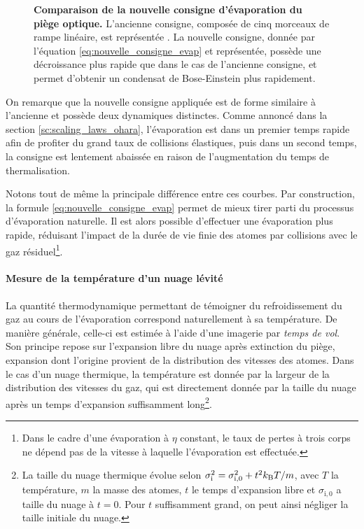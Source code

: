 \begin{figure}
\centering

\caption{\textbf{Comparaison de la nouvelle consigne d'évaporation du piège optique.} L'ancienne consigne, composée de cinq morceaux de rampe linéaire, est représentée . La nouvelle consigne, donnée par l'équation \ref{eq:nouvelle_consigne_evap} et représentée, possède une décroissance plus rapide que dans le cas de l'ancienne consigne, et permet d'obtenir un condensat de Bose-Einstein plus rapidement.}
\label{fig:comparaison_consigne_evap}
\end{figure}

On remarque que la nouvelle consigne appliquée est de forme similaire à l'ancienne et possède deux dynamiques distinctes. Comme annoncé dans la section \ref{sc:scaling_laws_ohara}, l'évaporation est dans un premier temps rapide afin de profiter du grand taux de collisions élastiques, puis dans un second temps, la consigne est lentement abaissée en raison de l'augmentation du temps de thermalisation. 

Notons tout de même la principale différence entre ces courbes. Par construction, la formule \ref{eq:nouvelle_consigne_evap} permet de mieux tirer parti du processus d'évaporation naturelle. Il est alors possible d'effectuer une évaporation plus rapide, réduisant l'impact de la durée de vie finie des atomes par collisions avec le gaz résiduel\footnote{Dans le cadre d'une évaporation à $\eta$ constant, le taux de pertes à trois corps ne dépend pas de la vitesse à laquelle l'évaporation est effectuée.}.
 









\paragraph*{Mesure de la température d'un nuage lévité}
La quantité thermodynamique permettant de témoigner du refroidissement du gaz au cours de l'évaporation correspond naturellement à sa température. De manière générale, celle-ci est estimée à l'aide d'une imagerie par \emph{temps de vol}. Son principe repose sur l'expansion libre du nuage après extinction du piège, expansion dont l'origine provient de la distribution des vitesses des atomes. Dans le cas d'un nuage thermique, la température est donnée par la largeur de la distribution des vitesses du gaz, qui est directement donnée par la taille du nuage après un temps d'expansion suffisamment long\footnote{La taille du nuage thermique évolue selon $\sigma_{\mathrm{i}}^2= \sigma_{\mathrm{i,0}}^2+ t^2 k_{\mathrm{B}} T/m$, avec $T$ la température, $m$ la masse des atomes, $t$ le temps d'expansion libre et $\sigma_{\mathrm{i,0}}$ a taille du nuage à $t=0$. Pour $t$ suffisamment grand, on peut ainsi négliger la taille initiale du nuage.}.

